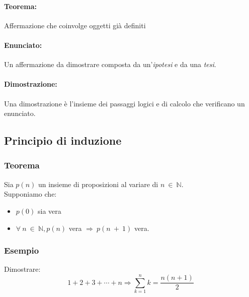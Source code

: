 \documentclass{article}
\begin{document}
        \paragraph{Teorema:\\ }
            Affermazione che coinvolge oggetti già definiti
        \paragraph{Enunciato:\\ }
            Un affermazione  da dimostrare composta da un'\textit{ipotesi} e da una \textit{tesi}.
        \hfill \break
        \paragraph{Dimostrazione:\\ }
            Una dimostrazione è l'insieme dei passaggi logici e di calcolo che verificano un enunciato.
        \subsection{Principio di induzione}
        \subsubsection*{Teorema}
            Sia $p(n)$ un insieme di proposizioni al variare di $n\ \in\ \mathbb{N}$.\\
            Supponiamo che:\\
            \begin{itemize}
                \item $p(0)$ sia vera
                \item $\forall\ n\ \in\ \mathbb{N}, p(n)$ vera $\Rightarrow\ p(n\ +\ 1)$ vera. 
            \end{itemize}
        \subsubsection*{Esempio}
        Dimostrare: \[1+2+3+\cdots+n \Rightarrow \sum_{k=1}^{n}k = \frac{n(n+1)}{2}\] 
\end{document}
